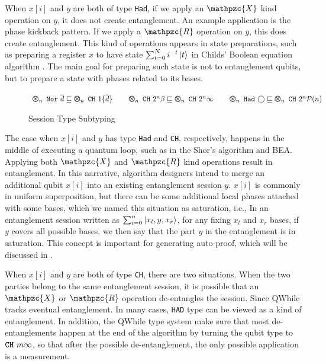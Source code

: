 When $x[i]$ and $y$ are both of type \texttt{Had}, if we apply an $\mathpzc{X}$ kind operation on $y$,
it does not create entanglement. An example application is the phase kickback pattern.
If we apply a $\mathpzc{R}$ operation on $y$, this does create entanglement.
This kind of operations appears in state preparations, such as preparing a register $x$ to have state $\sum_{t=0}^N i^{-t}\left\vert{t}\right\rangle$ in Childs' Boolean equation algorithm \cite{ChildsNAND}. 
The main goal for preparing such state is not to entanglement qubits, but to prepare a state with phases related to its bases.

\begin{figure}[t]
{\small
$
\begin{array}{l}
\ttype{n}{\tnor{\overline{d}}} \sqsubseteq \ttype{n}{\tch{1}{\{\overline{d}\}}}
\qquad 
\ttype{n}{\tch{2^n}{\beta}} \sqsubseteq \ttype{n}{\tch{2^n}{\infty}}
\qquad 
\ttype{n}{\thad{\bigcirc}} \sqsubseteq \ttype{n}{\tch{2^n}{\tpower{n}}}
\end{array}
$
}
  \caption{Session Type Subtyping}
  \label{fig:exp-subtyping}
\end{figure}

The case when $x[i]$ and $y$ has type \texttt{Had} and \texttt{CH}, respectively,
happens in the middle of executing a quantum loop, such as in the Shor's algorithm and BEA.
Applying both $\mathpzc{X}$ and $\mathpzc{R}$ kind operations result in entanglement.
In this narrative, algorithm designers intend to
merge an additional qubit $x[i]$ into an existing entanglement session $y$.
$x[i]$ is commonly in uniform superposition,
but there can be some additional local phases attached with some bases,
which we named this situation as saturation, i.e.,
In an entanglement session written as $\sum_{i=0}^n \left\vert{x_l,y,x_r}\right\rangle$,
for any fixing $x_l$ and $x_r$ bases, if $y$ covers all possible bases,
we then say that the part $y$ in the entanglement is in saturation.
This concept is important for generating auto-proof, which will be discussed in .


When $x[i]$ and $y$ are both of type \texttt{CH}, there are two situations.
When the two parties belong to the same entanglement session,
it is possible that an $\mathpzc{X}$ or $\mathpzc{R}$ operation de-entangles the session.
Since QWhile tracks eventual entanglement.
In many cases, \texttt{HAD} type can be viewed as a kind of entanglement.
In addition, the QWhile type system make sure that most de-entanglements happen
at the end of the algorithm by turning the qubit type to $\texttt{CH}~{m}{\infty}$,
so that after the possible de-entanglement, the only possible application is a measurement.

